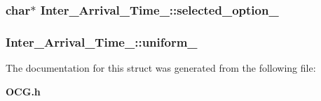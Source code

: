 \subsubsection[{selected\_\-option\_\-}]{\setlength{\rightskip}{0pt plus 5cm}char$\ast$ {\bf Inter\_\-Arrival\_\-Time\_\-::selected\_\-option\_\-}}\label{structInter__Arrival__Time___4a78363e878ac75c90b81c77cfa8ff51}


\subsubsection[{uniform\_\-}]{ {\bf Inter\_\-Arrival\_\-Time\_\-::uniform\_\-}}\label{structInter__Arrival__Time___01f8a89489c8a196b137de5ee102ddb6}




The documentation for this struct was generated from the following file:\begin{CompactItemize}
\item 
{\bf OCG.h}\end{CompactItemize}
